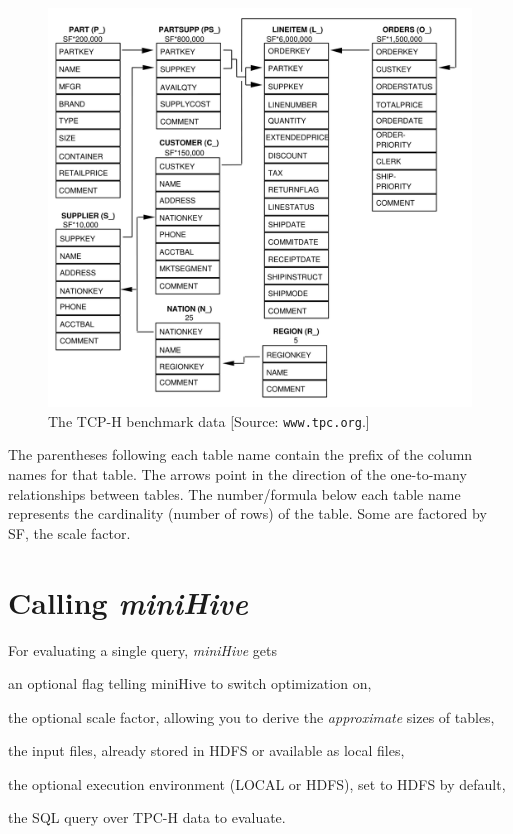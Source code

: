 \documentclass[12pt]{exam}
\begin{document}
\begin{figure}[t]
\centering
    \includegraphics[scale=.3]{tpch.png}
    \caption{The TCP-H benchmark data [Source: {\tt www.tpc.org}.]}
    \label{tpch}
\end{figure}

The parentheses following each table name contain the prefix of the column names for that table.
The arrows point in the direction of the one-to-many relationships between tables.
The number/formula below each table name represents the cardinality (number of rows) of the table. Some are factored by SF, the scale factor. 


\section{Calling {\em miniHive}\/}



For evaluating a single query, {\em miniHive} gets 

\begin{compactitem}
    \item an optional flag telling miniHive to switch optimization on, 
    \item the optional scale factor, allowing you to derive the
 {\em approximate}\/ sizes of tables,
    \item the input files, already stored in HDFS or available as local files, 

    \item the optional execution environment (LOCAL or HDFS), set to HDFS by default,
        \item the SQL query over TPC-H data  to evaluate.
\end{compactitem}
\end{document}
